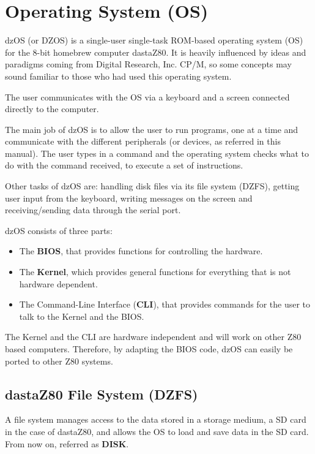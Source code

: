 \section{Operating System (OS)}
dzOS (or DZOS) is a single-user single-task ROM-based operating system (OS)
for the 8-bit homebrew computer dastaZ80. It is heavily influenced by ideas
and paradigms coming from Digital Research, Inc. CP/M, so some concepts may
sound familiar to those who had used this operating system.

The user communicates with the OS via a keyboard and a screen connected
directly to the computer.

The main job of dzOS is to allow the user to run programs, one at a time and
communicate with the different peripherals (or devices, as referred in this
manual). The user types in a command and the operating system checks what to
do with the command received, to execute a set of instructions.

Other tasks of dzOS are: handling disk files via its file system (DZFS),
getting user input from the keyboard, writing messages on the screen and
receiving/sending data through the serial port.

dzOS consists of three parts:
\begin{itemize}
    \item The \textbf{BIOS}, that provides functions for controlling the
    hardware.
    \item The \textbf{Kernel}, which provides general functions for
    everything that is not hardware dependent.
    \item The Command-Line Interface (\textbf{CLI}), that provides commands
    for the user to talk to the Kernel and the BIOS.
\end{itemize}

The Kernel and the CLI are hardware independent and will work on other Z80
based computers. Therefore, by adapting the BIOS code, dzOS can easily be
ported to other Z80 systems.

    \subsection{dastaZ80 File System (DZFS)}
    A file system manages access to the data stored in a storage medium, a
    SD card in the case of dastaZ80, and allows the OS to load and save data in
    the SD card. From now on, referred as \textbf{DISK}.

